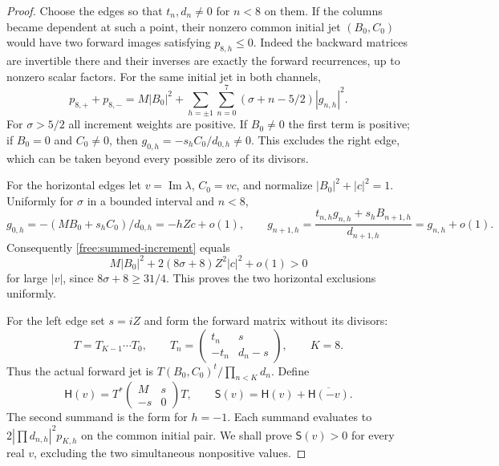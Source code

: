 \documentclass[11pt]{article}
\numberwithin{equation}{section}
\theoremstyle{definition}
\theoremstyle{remark}
\begin{document}
\begin{proof}
Choose the edges so that $t_n,d_n\ne0$ for $n<8$ on them.  If the
columns became dependent at such a point, their nonzero common initial
jet $(B_0,C_0)$ would have two forward images satisfying $p_{8,h}\le0$.
Indeed the backward matrices are invertible there and their inverses
are exactly the forward recurrences, up to nonzero scalar factors.
For the same initial jet in both channels,
\begin{equation}\label{free:summed-increment}
 p_{8,+}+p_{8,-}=M|B_0|^2+
 \sum_{h=\pm1}\sum_{n=0}^7
 (\sigma+n-5/2)|g_{n,h}|^2.
\end{equation}
For $\sigma>5/2$ all increment weights are positive.  If $B_0\ne0$
the first term is positive; if $B_0=0$ and $C_0\ne0$, then
$g_{0,h}=-s_hC_0/d_{0,h}\ne0$.  This excludes the right edge,
which can be taken beyond every possible zero of its divisors.

For the horizontal edges let $v=\operatorname{Im}\lambda$,
$C_0=vc$, and normalize $|B_0|^2+|c|^2=1$.
Uniformly for $\sigma$ in a bounded interval and $n<8$,
\[
 g_{0,h}=-(MB_0+s_hC_0)/d_{0,h}=-hZc+o(1),\qquad
 g_{n+1,h}=\frac{t_{n,h}g_{n,h}+s_hB_{n+1,h}}{d_{n+1,h}}
             =g_{n,h}+o(1).
\]
Consequently \eqref{free:summed-increment} equals
\[
 M|B_0|^2+2(8\sigma+8)Z^2|c|^2+o(1)>0
\]
for large $|v|$, since $8\sigma+8\ge31/4$.
This proves the two horizontal exclusions uniformly.

For the left edge set $s=iZ$ and form the forward matrix without its
divisors:
\begin{equation}\label{free:forward-matrix}
 T=T_{K-1}\cdots T_0,\qquad
 T_n=\begin{pmatrix}t_n&s\\-t_n&d_n-s\end{pmatrix},\qquad K=8.
\end{equation}
Thus the actual forward jet is $T(B_0,C_0)^t/\prod_{n<K}d_n$.
Define
\begin{equation}\label{free:boundary-form}
 \mathsf H(v)=T^*
 \begin{pmatrix}M&s\\-s&0\end{pmatrix}T,
 \qquad \mathsf S(v)=\mathsf H(v)+\overline{\mathsf H(-v)}.
\end{equation}
The second summand is the form for $h=-1$.  Each summand evaluates to
$2|\prod d_{n,h}|^2p_{K,h}$ on the common initial pair.  We shall prove
$\mathsf S(v)>0$ for every real $v$, excluding the two simultaneous
nonpositive values.


\end{proof}
\end{document}
